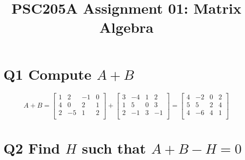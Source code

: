 \documentclass[
  letterpaper,
  DIV=11,
  numbers=noendperiod]{scrartcl}
\title{PSC205A Assignment 01: Matrix Algebra}
\author{}
\date{}
\begin{document}
\maketitle

\section{\texorpdfstring{Q1 Compute
\(A + B\)}{Q1 Compute A + B}}\label{q1-compute-a-b}

\[
A + B = \begin{bmatrix}
1 & 2 & -1 & 0 \\
4 & 0 & 2 & 1 \\
2 & -5 & 1 & 2 \\
\end{bmatrix} + \begin{bmatrix}
3 & -4 & 1 & 2 \\
1 & 5 & 0 & 3 \\
2 & -1 & 3 & -1 \\
\end{bmatrix} = \begin{bmatrix}
4 & -2 & 0 & 2 \\
5 & 5 & 2 & 4 \\
4 & -6 & 4 & 1 \\
\end{bmatrix}
\]

\section{\texorpdfstring{Q2 Find \(H\) such that
\(A + B - H = 0\)}{Q2 Find H such that A + B - H = 0}}\label{q2-find-h-such-that-a-b---h-0}
\end{document}
